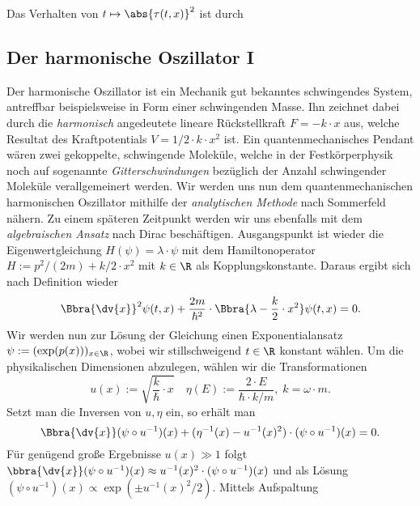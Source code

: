 \documentclass{subfiles}
\begin{document}
    Das Verhalten von $t\mapsto \abs{\tau(t,x)}^2$ ist durch 
    \begin{figure}
        \centering
    \end{figure}

    \subsection{Der harmonische Oszillator I}
    Der harmonische Oszillator ist ein Mechanik gut bekanntes schwingendes System, antreffbar beispielsweise in Form einer schwingenden Masse. Ihn zeichnet dabei durch die \emph{harmonisch} angedeutete lineare Rückstellkraft $F = -k\cdot x$ aus, welche Resultat des Kraftpotentials $V = 1/2\cdot k\cdot x^2$ ist. Ein quantenmechanisches Pendant wären zwei gekoppelte, schwingende Moleküle, welche in der Festkörperphysik noch auf sogenannte \emph{Gitterschwindungen} bezüglich der Anzahl schwingender Moleküle verallgemeinert werden. Wir werden uns nun dem quantenmechanischen harmonischen Oszillator mithilfe der \emph{analytischen Methode} nach Sommerfeld nähern. Zu einem späteren Zeitpunkt werden wir uns ebenfalls mit dem \emph{algebraischen Ansatz} nach Dirac beschäftigen. Ausgangspunkt ist wieder die Eigenwertgleichung $H(\psi) = \lambda\cdot\psi$ mit dem Hamiltonoperator $H := p^2/(2m) + k/2\cdot x^2$ mit $k\in\R$ als Kopplungskonstante. Daraus ergibt sich nach Definition wieder
    \[\Bbra{\dv{x}}^2\psi(t,x) + \frac{2m}{\hbar^2}\cdot\Bbra{\lambda - \frac{k}{2}\cdot x^2}\psi(t,x) = 0.\]
    Wir werden nun zur Lösung der Gleichung einen Exponentialansatz $\psi:=(\exp(p(x)))_{x\in\R}$, wobei wir stillschweigend $t\in\R$ konstant wählen. Um die physikalischen Dimensionen abzulegen, wählen wir die Transformationen 
    \[u(x):=\sqrt{\frac{k}{\hbar}\cdot x}\quad\eta(E):=\frac{2\cdot E}{\hbar\cdot k/m},\; k=\omega\cdot m.\]
    Setzt man die Inversen von $u,\eta$ ein, so erhält man
    \[\Bbra{\dv{x}}(\psi\circ u^{-1})(x) + (\eta^{-1}(x) - u^{-1}(x)^2)\cdot(\psi\circ u^{-1})(x) = 0.\]
    Für genügend große Ergebnisse $u(x)\gg 1$ folgt $\bbra{\dv{x}}(\psi\circ u^{-1})(x)\approx u^{-1}(x)^2\cdot(\psi\circ u^{-1})(x)$ und als Lösung $(\psi\circ u^{-1})(x) \propto \exp(\pm u^{-1}(x)^2/2)$. Mittels Aufspaltung
\end{document}
